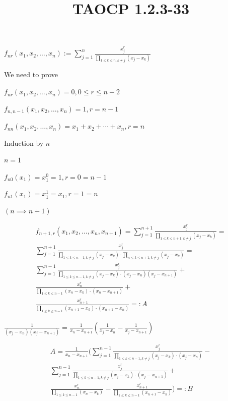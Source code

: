 \documentclass{article}
\title{TAOCP 1.2.3\mbox{-}33}
\begin{document}
\maketitle

\( f_{nr} (x_{1},x_{2},\ldots,x_{n}) := \sum_{j=1}^{n}\frac{x_{j}^{r}}{\prod_{1 \leq k \leq n, k \neq j}(x_{j}-x_{k})} \)

We need to prove

\( f_{nr}(x_{1},x_{2},\ldots,x_{n}) = 0, 0 \leq r \leq n - 2 \)

\( f_{n,n-1}(x_{1},x_{2},\ldots,x_{n}) = 1, r = n - 1 \)

\( f_{nn}(x_{1},x_{2},\ldots,x_{n}) = x_{1} + x_{2} + \cdots + x_{n}, r = n \)

Induction by \( n \)

\( n = 1 \)

\( f_{n0}(x_{1}) = x_{1}^{0} = 1, r = 0 = n - 1 \)

\( f_{n1}(x_{1}) = x_{1}^{1} = x_{1}, r = 1 = n \)

\( (n \implies n + 1) \)

\begin{multline*}
f_{n+1,r}(x_{1},x_{2},\ldots,x_{n},x_{n+1}) = \sum_{j=1}^{n+1}\frac{x_{j}^{r}}{\prod_{1 \leq k \leq n + 1, k \neq j}(x_{j}-x_{k})} = \\
\sum_{j=1}^{n+1}\frac{x_{j}^{r}}{\prod_{1 \leq k \leq n - 1, k \neq j}(x_{j}-x_{k}) \cdot \prod_{n \leq k \leq n + 1, k \neq j}(x_{j}-x_{k}) } = \\
\sum_{j=1}^{n-1}\frac{x_{j}^{r}}{\prod_{1 \leq k \leq n - 1, k \neq j}(x_{j}-x_{k}) \cdot (x_{j}-x_{n})(x_{j}-x_{n+1}) } + \\
\frac{x_{n}^{r}}{\prod_{1 \leq k \leq n - 1}(x_{n}-x_{k})\cdot(x_{n}-x_{n+1})} + \\
\frac{x_{n+1}^{r}}{\prod_{1 \leq k \leq n - 1}(x_{n+1}-x_{k})\cdot(x_{n+1}-x_{n})} =: A
\end{multline*}

\( \frac{1}{(x_{j}-x_{n})(x_{j}-x_{n+1})} = \frac{1}{x_{n}-x_{n+1}} (\frac{1}{x_{j}-x_{n}} - \frac{1}{x_{j}-x_{n+1}}) \)

\begin{multline*}
A = \frac{1}{x_{n}-x_{n+1}}(\sum_{j=1}^{n-1}\frac{x_{j}^{r}}{\prod_{1 \leq k \leq n - 1, k \neq j}(x_{j}-x_{k}) \cdot (x_{j}-x_{n})} - \\
\sum_{j=1}^{n-1}\frac{x_{j}^{r}}{\prod_{1 \leq k \leq n - 1, k \neq j}(x_{j}-x_{k}) \cdot (x_{j}-x_{n+1})} + \\
\frac{x_{n}^{r}}{\prod_{1 \leq k \leq n - 1}(x_{n}-x_{k})} - \frac{x_{n+1}^{r}}{\prod_{1 \leq k \leq n - 1}(x_{n+1}-x_{k})}) =: B
\end{multline*}
\end{document}
